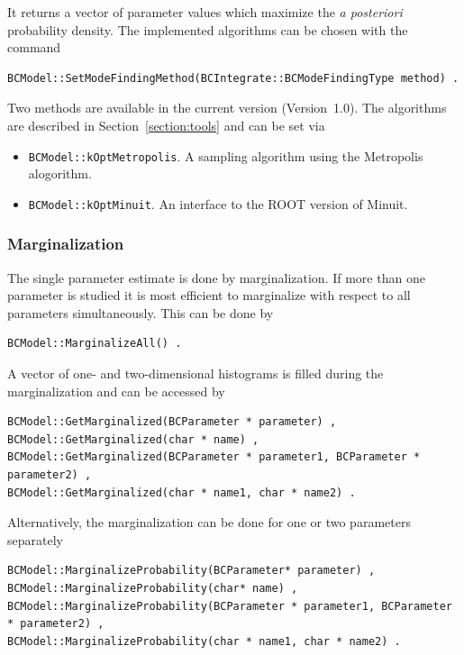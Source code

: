 \documentclass[11pt, a4paper]{article}
\newcommand{\versionno}{1.0}
\newcommand{\Version}{Version~\versionno}
\begin{document}
\noindent 
It returns a vector of parameter values which maximize the {\it a
  posteriori} probability density. The implemented algorithms can be
chosen with the command
%
\begin{verbatim}
BCModel::SetModeFindingMethod(BCIntegrate::BCModeFindingType method) .
\end{verbatim}
%
Two methods are available in the current version (\Version). The
algorithms are described in Section~\ref{section:tools} and can be set
via
%
\begin{itemize}
\item \verb|BCModel::kOptMetropolis|. A sampling algorithm using the
  Metropolis alogorithm.
\item \verb|BCModel::kOptMinuit|. An interface to the ROOT version of Minuit.
\end{itemize}


\subsubsection{Marginalization} 

\noindent 
The single parameter estimate is done by marginalization. If more than
one parameter is studied it is most efficient to marginalize with
respect to all parameters simultaneously. This can be done by
%
\begin{verbatim}
BCModel::MarginalizeAll() . 
\end{verbatim} 

\noindent 
A vector of one- and two-dimensional histograms is filled during the
marginalization and can be accessed by
%
\begin{verbatim}
BCModel::GetMarginalized(BCParameter * parameter) ,
BCModel::GetMarginalized(char * name) ,
BCModel::GetMarginalized(BCParameter * parameter1, BCParameter * parameter2) ,
BCModel::GetMarginalized(char * name1, char * name2) .
\end{verbatim}

\noindent 
Alternatively, the marginalization can be done for one or two
parameters separately
%
\begin{verbatim}
BCModel::MarginalizeProbability(BCParameter* parameter) ,
BCModel::MarginalizeProbability(char* name) , 
BCModel::MarginalizeProbability(BCParameter * parameter1, BCParameter * parameter2) ,
BCModel::MarginalizeProbability(char * name1, char * name2) .
\end{verbatim} 
\end{document}
